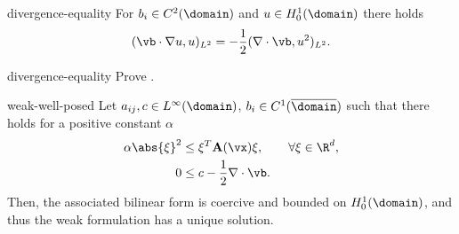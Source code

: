 \begin{Lemma}{divergence-equality}
  For $b_i \in C^2(\domain)$ and $u\in H^1_0(\domain)$ there holds
  \begin{align}
    (\vb\cdot\nabla u,u)_{L^2} = -\frac12 (\nabla \cdot\vb,u^2)_{L^2}.
  \end{align}
\end{Lemma}

\begin{Problem}{divergence-equality}
  Prove .
\end{Problem}


\begin{Lemma}{weak-well-posed}
  Let $a_{ij}, c\in L^\infty(\domain)$, $b_i \in C^1(\overline{\domain})$ such
  that there holds for a positive constant $\alpha$
  \begin{gather}
    \label{eq:hilbert:elliptic}
    \begin{split}
    \alpha\abs{\xi}^2 &\le \xi^T \mathbf A(\vx) \xi,
    \qquad \forall \xi \in \R^d,
    \\
    0 &\le c - \frac12 \nabla\cdot \vb.
    \end{split}
  \end{gather}
  Then, the associated bilinear form is coercive and bounded on
  $H^1_0(\domain)$, and thus the weak formulation has a unique
  solution.
\end{Lemma}

